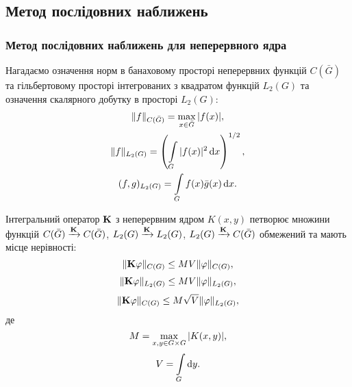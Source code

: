 \subsection{Метод послідовних наближень}

\subsubsection{Метод послідовних наближень для неперервного ядра}

Нагадаємо означення норм в банаховому просторі неперервних функцій $C(\bar G)$ та гільбертовому просторі інтегрованих з квадратом функцій $L_2(G)$ та означення скалярного добутку в просторі $L_2(G)$:
\begin{multline*} 
	\|f\|_{C(\bar G)} = \Max_{x \in \bar G} |f(x)|, \\
	\|f\|_{L_2(G)} = \left( \Int_G |f(x)|^2 \diff x \right)^{1/2}, \\
	(f, g)_{L_2(G)} = \Int_G f(x) \bar g(x) \diff x.
\end{multline*}

\begin{lemma} 
	Інтегральний оператор $\bf{K}$ з неперервним ядром $K(x, y)$ петворює множини функцій $C(\bar G) \xrightarrow{\bf{K}} C(\bar G)$, $L_2(G) \xrightarrow{\bf{K}} L_2(G)$, $L_2(G) \xrightarrow{\bf{K}} C(\bar G)$ обмежений та мають місце нерівності:
	\begin{equation}
		\label{eq:1.1}
		\| \bf{K} \phi \|_{C(G)} \le M V \| \phi \|_{C(G)},
	\end{equation}
	\begin{equation}
		\label{eq:1.2}
		\| \bf{K} \phi \|_{L_2(G)} \le M V \| \phi \|_{L_2(G)},
	\end{equation}
	\begin{equation}
		\label{eq:1.3}
		\| \bf{K} \phi \|_{C(G)} \le M \sqrt{V} \| \phi \|_{L_2(G)},
	\end{equation}
	де
	\begin{equation}
		\label{eq:1.4}
		M = \Max_{x, y \in G \times G} |K(x, y)|,
	\end{equation}
	\begin{equation}
		\label{eq:1.5}
		V = \Int_G \diff y.
	\end{equation}
\end{lemma}


